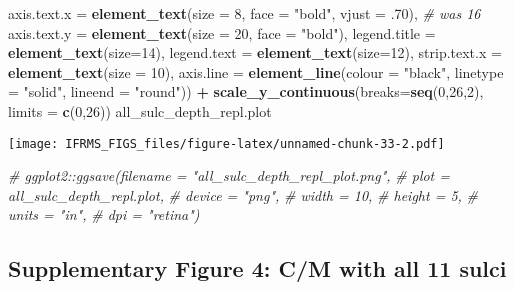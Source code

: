 \documentclass[
]{article}
\newenvironment{Shaded}{\begin{snugshade}}{\end{snugshade}}
\newcommand{\CommentTok}[1]{\textcolor[rgb]{0.56,0.35,0.01}{\textit{#1}}}
\newcommand{\DataTypeTok}[1]{\textcolor[rgb]{0.13,0.29,0.53}{#1}}
\newcommand{\DecValTok}[1]{\textcolor[rgb]{0.00,0.00,0.81}{#1}}
\newcommand{\FloatTok}[1]{\textcolor[rgb]{0.00,0.00,0.81}{#1}}
\newcommand{\KeywordTok}[1]{\textcolor[rgb]{0.13,0.29,0.53}{\textbf{#1}}}
\newcommand{\NormalTok}[1]{#1}
\newcommand{\OperatorTok}[1]{\textcolor[rgb]{0.81,0.36,0.00}{\textbf{#1}}}
\newcommand{\StringTok}[1]{\textcolor[rgb]{0.31,0.60,0.02}{#1}}
\begin{document}
\begin{Shaded}
\begin{Highlighting}[]
        \DataTypeTok{axis.text.x =} \KeywordTok{element_text}\NormalTok{(}\DataTypeTok{size =} \DecValTok{8}\NormalTok{, }\DataTypeTok{face =} \StringTok{"bold"}\NormalTok{, }\DataTypeTok{vjust =} \FloatTok{.70}\NormalTok{), }\CommentTok{# was 16}
        \DataTypeTok{axis.text.y =} \KeywordTok{element_text}\NormalTok{(}\DataTypeTok{size =} \DecValTok{20}\NormalTok{, }\DataTypeTok{face =} \StringTok{"bold"}\NormalTok{),}
        \DataTypeTok{legend.title =} \KeywordTok{element_text}\NormalTok{(}\DataTypeTok{size=}\DecValTok{14}\NormalTok{), }
        \DataTypeTok{legend.text =} \KeywordTok{element_text}\NormalTok{(}\DataTypeTok{size=}\DecValTok{12}\NormalTok{),}
        \DataTypeTok{strip.text.x =} \KeywordTok{element_text}\NormalTok{(}\DataTypeTok{size =} \DecValTok{10}\NormalTok{),}
        \DataTypeTok{axis.line =} \KeywordTok{element_line}\NormalTok{(}\DataTypeTok{colour =} \StringTok{"black"}\NormalTok{, }\DataTypeTok{linetype =} \StringTok{"solid"}\NormalTok{, }\DataTypeTok{lineend =} \StringTok{"round"}\NormalTok{)) }\OperatorTok{+}
\StringTok{  }\KeywordTok{scale_y_continuous}\NormalTok{(}\DataTypeTok{breaks=}\KeywordTok{seq}\NormalTok{(}\DecValTok{0}\NormalTok{,}\DecValTok{26}\NormalTok{,}\DecValTok{2}\NormalTok{), }\DataTypeTok{limits =} \KeywordTok{c}\NormalTok{(}\DecValTok{0}\NormalTok{,}\DecValTok{26}\NormalTok{))}
\NormalTok{all_sulc_depth_repl.plot}
\end{Highlighting}
\end{Shaded}

\texttt{[image: IFRMS\_FIGS\_files/figure-latex/unnamed-chunk-33-2.pdf]}

\begin{Shaded}
\begin{Highlighting}[]
\CommentTok{# ggplot2::ggsave(filename = "all_sulc_depth_repl_plot.png",}
\CommentTok{#                 plot = all_sulc_depth_repl.plot,}
\CommentTok{#                 device = "png",}
\CommentTok{#                 width = 10,}
\CommentTok{#                 height = 5, }
\CommentTok{#                 units = "in",}
\CommentTok{#                 dpi = "retina")}
\end{Highlighting}
\end{Shaded}

\hypertarget{supplementary-figure-4-cm-with-all-11-sulci}{%
\subsection{Supplementary Figure 4: C/M with all 11
sulci}\label{supplementary-figure-4-cm-with-all-11-sulci}}
\end{document}
